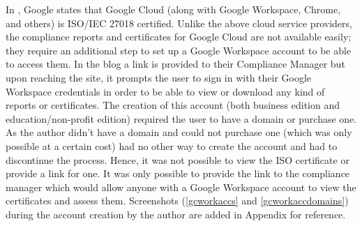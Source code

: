 \begin{itemize}
    In \cite{gcisoblog}, Google states that Google Cloud (along with Google Workspace, Chrome, and others) is \acs{ISO}/\acs{IEC} 27018 certified. Unlike the above cloud service providers, the compliance reports and certificates for Google Cloud are not available easily; they require an additional step to set up a Google Workspace account to be able to access them. In the blog a link is provided to their Compliance Manager \cite{gccompliancemgr} but upon reaching the site, it prompts the user to sign in with their Google Workspace credentials in order to be able to view or download any kind of reports or certificates. The creation of this account (both business edition and education/non-profit edition) required the user to have a domain or purchase one. As the author didn't have a domain and could not purchase one (which was only possible at a certain cost) had no other way to create the account and had to discontinue the process. Hence, it was not possible to view the \acs{ISO} certificate or provide a link for one. It was only possible to provide the link to the compliance manager \cite{gccompliancemgr} which would allow anyone with a Google Workspace account to view the certificates and assess them. Screenshots (\ref{gcworkaccs} and \ref{gcworkaccdomains}) during the account creation by the author are added in Appendix for reference.
    
\end{itemize}